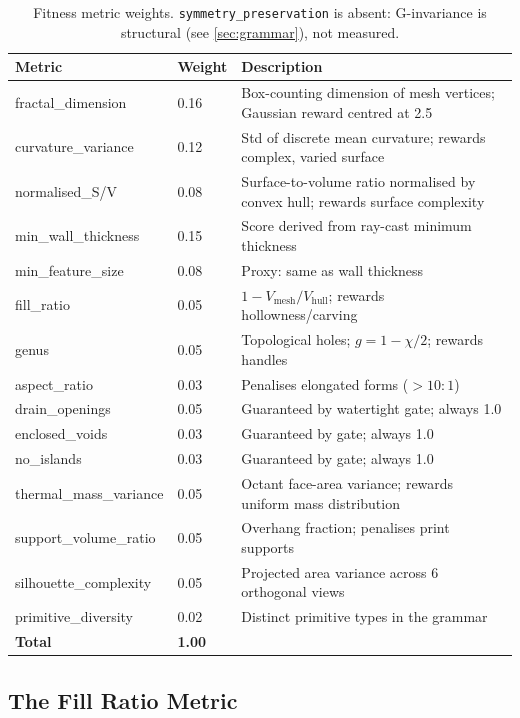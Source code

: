 \documentclass[11pt, a4paper]{article}
\begin{document}
\begin{table}[h]
\centering
\begin{tabular}{llp{7cm}}
\toprule
Metric & Weight & Description \\
\midrule
fractal\_dimension     & 0.16 & Box-counting dimension of mesh vertices; Gaussian reward centred at 2.5 \\
curvature\_variance    & 0.12 & Std of discrete mean curvature; rewards complex, varied surface \\
normalised\_S/V        & 0.08 & Surface-to-volume ratio normalised by convex hull; rewards surface complexity \\
min\_wall\_thickness   & 0.15 & Score derived from ray-cast minimum thickness \\
min\_feature\_size     & 0.08 & Proxy: same as wall thickness \\
fill\_ratio            & 0.05 & $1 - V_{\mathrm{mesh}}/V_{\mathrm{hull}}$; rewards hollowness/carving \\
genus                  & 0.05 & Topological holes; $g = 1 - \chi/2$; rewards handles \\
aspect\_ratio          & 0.03 & Penalises elongated forms ($> 10:1$) \\
drain\_openings        & 0.05 & Guaranteed by watertight gate; always 1.0 \\
enclosed\_voids        & 0.03 & Guaranteed by gate; always 1.0 \\
no\_islands            & 0.03 & Guaranteed by gate; always 1.0 \\
thermal\_mass\_variance& 0.05 & Octant face-area variance; rewards uniform mass distribution \\
support\_volume\_ratio & 0.05 & Overhang fraction; penalises print supports \\
silhouette\_complexity & 0.05 & Projected area variance across 6 orthogonal views \\
primitive\_diversity   & 0.02 & Distinct primitive types in the grammar \\
\midrule
\textbf{Total}         & \textbf{1.00} & \\
\bottomrule
\end{tabular}
\caption{Fitness metric weights. \texttt{symmetry\_preservation} is absent:
G-invariance is structural (see \cref{sec:grammar}), not measured.}
\label{tab:weights}
\end{table}

\subsection{The Fill Ratio Metric}
\end{document}
